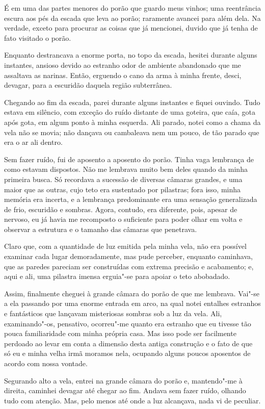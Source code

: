 É em uma das partes menores do porão que guardo meus vinhos; uma reentrância escura aos pés da escada que leva ao
porão; raramente avancei para além dela. Na verdade, exceto para procurar as coisas que já mencionei, duvido que já
tenha de fato visitado o porão.

Enquanto destrancava a enorme porta, no topo da escada, hesitei durante alguns instantes, ansioso devido ao estranho
odor de ambiente abandonado que me assaltava as narinas. Então, erguendo o cano da arma à minha frente, desci,
devagar, para a escuridão daquela região subterrânea.

Chegando ao fim da escada, parei durante alguns instantes e fiquei ouvindo. Tudo estava em silêncio, com exceção do
ruído distante de uma goteira, que caía, gota após gota, em algum ponto à minha esquerda. Ali parado, notei como a
chama da vela não se movia; não dançava ou cambaleava nem um pouco, de tão parado que era o ar ali dentro.

Sem fazer ruído, fui de aposento a aposento do porão. Tinha vaga lembrança de como estavam dispostos. Não me lembrava
muito bem deles quando da minha primeira busca. Só recordava a sucessão de diversas câmaras grandes, e uma maior
que as outras, cujo teto era sustentado por pilastras; fora isso, minha memória era incerta, e a lembrança predominante
era uma sensação generalizada de frio, escuridão e sombras. Agora, contudo, era diferente, pois, apesar de nervoso, eu
já havia me recomposto o suficiente para poder olhar em volta e observar a estrutura e o tamanho das câmaras que
penetrava.

Claro que, com a quantidade de luz emitida pela minha vela, não era possível examinar cada lugar demoradamente, mas
pude perceber, enquanto caminhava, que as paredes pareciam ser construídas com extrema precisão e acabamento; e, aqui e
ali, uma pilastra imensa erguia"-se para apoiar o teto abobadado.

Assim, finalmente cheguei à grande câmara do porão de que me lembrava. Vai"-se a ela passando por uma enorme entrada
em arco, na qual notei entalhes estranhos e fantásticos que lançavam misteriosas sombras sob a luz da vela. Ali,
examinando"-os, pensativo, ocorreu"-me quanto era estranho que eu tivesse tão pouca familiaridade com minha própria
casa. Mas isso pode ser facilmente perdoado ao levar em conta a dimensão desta antiga construção e o fato de que só eu
e minha velha irmã moramos nela, ocupando alguns poucos aposentos de acordo com nossa vontade.

Segurando alto a vela, entrei na grande câmara do porão e, mantendo"-me à direita, caminhei devagar até chegar ao
fim. Andava sem fazer ruído, olhando tudo com atenção. Mas, pelo menos até onde a luz alcançava, nada vi de peculiar.

